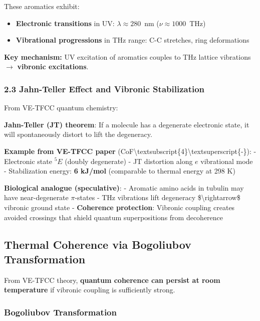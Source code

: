 These aromatics exhibit:
\begin{itemize}
\item \textbf{Electronic transitions} in UV: $\lambda \approx 280$~nm ($\nu \approx 1000$~THz)
\item \textbf{Vibrational progressions} in THz range: C-C stretches, ring deformations
\end{itemize}

\textbf{Key mechanism:} UV excitation of aromatics couples to THz lattice vibrations $\rightarrow$ \textbf{vibronic excitations}.

\subsubsection{2.3 Jahn-Teller Effect and Vibronic
Stabilization}\label{jahn-teller-effect-and-vibronic-stabilization}

From VE-TFCC quantum chemistry:

\textbf{Jahn-Teller (JT) theorem}: If a molecule has a degenerate
electronic state, it will spontaneously distort to lift the degeneracy.

\textbf{Example from VE-TFCC paper}
(CoF\textbackslash textsubscript\{4\}\textbackslash textsuperscript\{-\}):
- Electronic state \(^5E\) (doubly degenerate) - JT distortion along
\(e\) vibrational mode - Stabilization energy: \textbf{6 kJ/mol}
(comparable to thermal energy at 298 K)

\textbf{Biological analogue (speculative)}: - Aromatic amino acids in
tubulin may have near-degenerate \(\pi\)-states - THz vibrations lift
degeneracy \$\textbackslash rightarrow\$ vibronic ground state -
\textbf{Coherence protection}: Vibronic coupling creates avoided
crossings that shield quantum superpositions from decoherence

\subsection{Thermal Coherence via Bogoliubov Transformation}

From VE-TFCC theory, \textbf{quantum coherence can persist at room temperature} if vibronic coupling is sufficiently strong.

\subsubsection{Bogoliubov Transformation}

